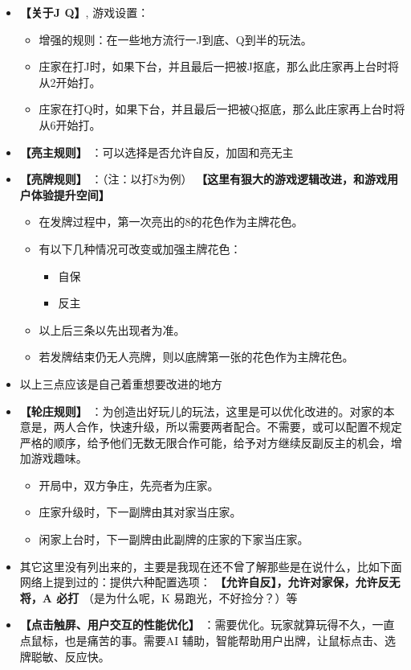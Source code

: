 \documentclass[9pt, b5paper]{article}
\begin{document}
\begin{itemize}
\item \textbf{【关于J Q】}, 游戏设置： 
\begin{itemize}
\item 增强的规则：在一些地方流行一J到底、Q到半的玩法。
\item 庄家在打J时，如果下台，并且最后一把被J抠底，那么此庄家再上台时将从2开始打。
\item 庄家在打Q时，如果下台，并且最后一把被Q抠底，那么此庄家再上台时将从6开始打。
\end{itemize}
\item \textbf{【亮主规则】} ：可以选择是否允许自反，加固和亮无主
\item \textbf{【亮牌规则】} ：（注：以打8为例） \textbf{【这里有狠大的游戏逻辑改进，和游戏用户体验提升空间】}
\begin{itemize}
\item 在发牌过程中，第一次亮出的8的花色作为主牌花色。
\item 有以下几种情况可改变或加强主牌花色：
\begin{itemize}
\item 自保
\item 反主
\end{itemize}
\item 以上后三条以先出现者为准。
\item 若发牌结束仍无人亮牌，则以底牌第一张的花色作为主牌花色。
\end{itemize}
\item 以上三点应该是自己着重想要改进的地方
\item \textbf{【轮庄规则】} ：为创造出好玩儿的玩法，这里是可以优化改进的。对家的本意是，两人合作，快速升级，所以需要两者配合。不需要，或可以配置不规定严格的顺序，给予他们无数无限合作可能，给予对方继续反副反主的机会，增加游戏趣味。
\begin{itemize}
\item 开局中，双方争庄，先亮者为庄家。
\item 庄家升级时，下一副牌由其对家当庄家。
\item 闲家上台时，下一副牌由此副牌的庄家的下家当庄家。
\end{itemize}
\item 其它这里没有列出来的，主要是我现在还不曾了解那些是在说什么，比如下面网络上提到过的：提供六种配置选项： \textbf{【允许自反】，允许对家保，允许反无将，A 必打} （是为什么呢，K 易跑光，不好捡分？）等
\item \textbf{【点击触屏、用户交互的性能优化】} ：需要优化。玩家就算玩得不久，一直点鼠标，也是痛苦的事。需要AI 辅助，智能帮助用户出牌，让鼠标点击、选牌聪敏、反应快。

\end{itemize}
\end{document}
